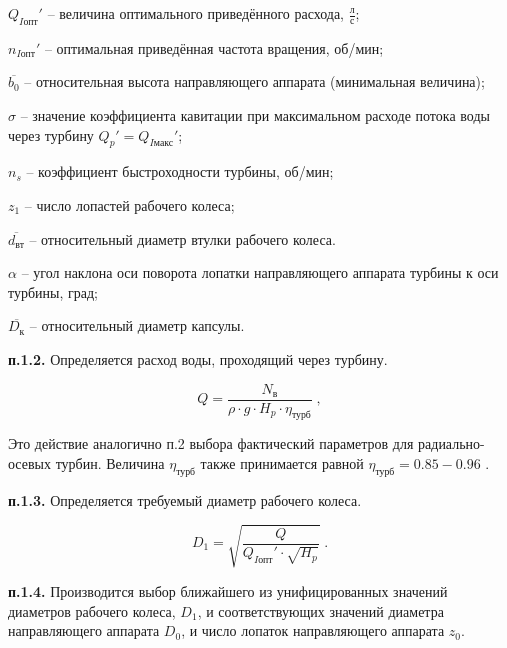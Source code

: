 $Q_{I\text{опт}}'$ -- величина оптимального приведённого расхода, $\frac{\text{л}}{\text{с}}$;

\vspace{0.1cm}

$n_{I\text{опт}}'$  -- оптимальная приведённая частота вращения, об/мин;

\vspace{0.2cm}

$\overline{b_0}$ -- относительная высота направляющего аппарата (минимальная величина);

$\sigma$ -- значение коэффициента кавитации при максимальном расходе потока воды через турбину $Q_p' = Q_{I\text{макс}}'$;

$n_s$ -- коэффициент быстроходности турбины, об/мин;

$z_1$ -- число лопастей рабочего колеса;

\vspace{0.2cm}

$\overline{d_{\text{вт}}}$ -- относительный диаметр втулки рабочего колеса.


$\alpha$ -- угол наклона оси поворота лопатки направляющего аппарата турбины к оси турбины, град;

\vspace{0.2cm}

$\overline{D_{\text{к}}}$ -- относительный диаметр капсулы.

\renewcommand{\arraystretch}{1.0}








\vspace{1.2cm}

\textbf{п.1.2.} Определяется расход воды, проходящий через турбину.

$$
  Q = \frac{N_{\text{в}}}{\rho \cdot g \cdot H_p \cdot \eta_{\text{турб}} } \; ,
$$

Это действие аналогично п.2 выбора фактический параметров для радиально-осевых турбин. Величина $\eta_{\text{турб}}$ также принимается равной  $\eta_{\text{турб}} = 0.85 - 0.96$ .


\vspace{0.5cm}
\textbf{п.1.3.} Определяется требуемый диаметр рабочего колеса.

$$
   D_1 = \sqrt{ \frac{Q}{Q_{I\text{опт}}' \cdot \sqrt{H_p}} } \; .
$$

\vspace{0.5cm}

\textbf{п.1.4.} Производится выбор ближайшего из унифицированных значений диаметров рабочего колеса, $D_1$, и соответствующих значений диаметра направляющего аппарата $D_0$, и число лопаток направляющего аппарата $z_0$.

